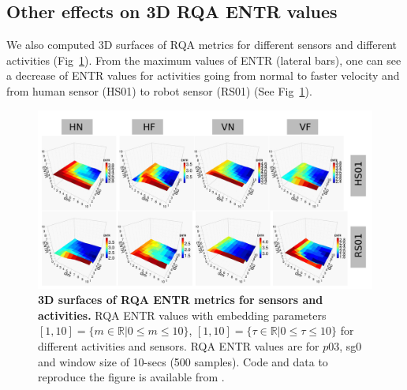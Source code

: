 \documentclass[fleqn,10pt]{wlscirep}
\begin{document}
\subsection*{Other effects on 3D RQA ENTR values}

We also computed 3D surfaces of RQA metrics for different sensors 
and different activities (Fig~\ref{fig:3dRQAENTR_sensoractivities}).
From the maximum values of ENTR (lateral bars), one can see 
a decrease of ENTR values for activities going from normal to 
faster velocity and from human sensor (HS01) to robot sensor (RS01) 
(See Fig~\ref{fig:3dRQAENTR_sensoractivities}). 
\begin{figure}[ht]
\centering
\includegraphics[width=1.0\textwidth]{figures/rqa/pdf/rqa_sensors_activities}
    \caption{
	{\bf 3D surfaces of RQA ENTR metrics for sensors and activities.}
	RQA ENTR values with embedding parameters
	$[1,10]= \{ m \in \mathbb{R} | 0 \le m \le 10  \}$,
	$[1,10]= \{ \tau \in \mathbb{R} | 0 \le \tau \le 10  \}$
	for different activities and sensors. 
	RQA ENTR values are for $p03$, sg0 and window size of 10-secs (500 samples).
	Code and data to reproduce the figure is available from \cite{srep2019}.
       }
\label{fig:3dRQAENTR_sensoractivities}
\end{figure}
\end{document}
